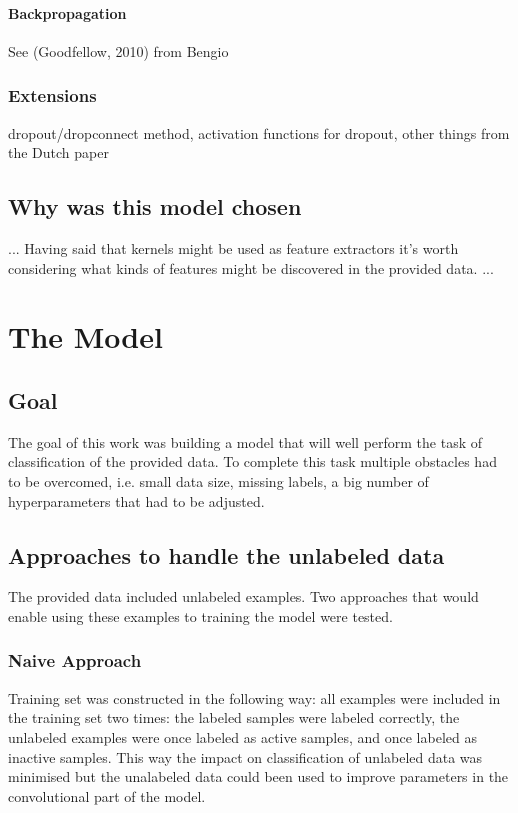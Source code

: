 \documentclass[a4paper,10pt]{report}
\begin{document}
	\subsubsection{Backpropagation} %
	  See (Goodfellow, 2010) from Bengio\\
	
      \subsection{Extensions} %
	dropout/dropconnect method, activation functions for dropout, other things from the Dutch paper\\
	
	
    \section{Why was this model chosen}
	... Having said that kernels might be used as feature extractors it's worth considering what kinds of features might be discovered in the provided data. ...\\
	
  \chapter{The Model} %
      
      \section{Goal}
      The goal of this work was building a model that will well perform the task of classification of the provided data. To complete this task multiple obstacles had to be overcomed, i.e. small data size, missing labels, a big number of hyperparameters that had to be adjusted.\\
      
      \section{Approaches to handle the unlabeled data}      
      The provided data included unlabeled examples. Two approaches that would enable using these examples to training the model were tested.\\
      
	\subsection{Naive Approach}
	Training set was constructed in the following way: all examples were included in the training set two times: the labeled samples were labeled correctly, the unlabeled examples were once labeled as active samples, and once labeled as inactive samples. This way the impact on classification of unlabeled data was minimised but the unalabeled data could been used to improve parameters in the convolutional part of the model.\\
	    
\end{document}
